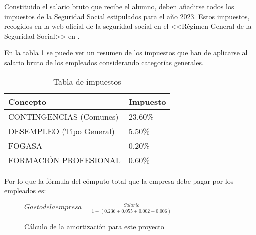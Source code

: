 Constituido el salario bruto que recibe el alumno, deben añadirse todos los
impuestos de la Seguridad Social estipulados para el año 2023. Estos impuestos,
recogidos en la web oficial de la seguridad social en el <<Régimen General de la
Seguridad Social>> en \cite{cotizacion2023}.

En la tabla \ref{tabla:seg-social} se puede ver un resumen de los impuestos que
han de aplicarse al salario bruto de los empleados considerando categorías
generales.

\begin{table}[H]
    \centering
    \begin{tabular}{ll}
        \toprule
    \textbf{Concepto}  & \textbf{Impuesto} \\ \midrule
    CONTINGENCIAS   (Comunes)  & 23.60\% \\
    DESEMPLEO  (Tipo General) & 5.50\%  \\
    FOGASA                   & 0.20\%  \\
    FORMACIÓN PROFESIONAL      & 0.60\% 
    \end{tabular}%
    \caption{Tabla de impuestos}
    \label{tabla:seg-social}
\end{table}

Por lo que la fórmula del cómputo total que la empresa debe pagar por los
empleados es:

\begin{figure}
\begin{center}
    $Gasto de la empresa = \frac{Salario}{1-(0.236+0.055+0.002+0.006)}$
\end{center}
\caption{Cálculo de la amortización para este proyecto}
\end{figure}


\begin{table}[H]
\caption{Salarios brutos y coste que supone a la empresa}
\label{tabla:salarios}
\end{table}

